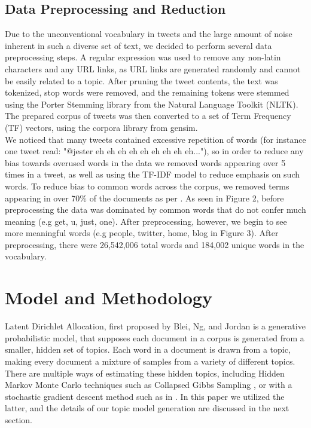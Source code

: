 \documentclass{acm_proc_article-sp}
\begin{document}
\subsection{Data Preprocessing and Reduction}
\hspace*{5mm}Due to the unconventional vocabulary in tweets and the large amount of noise inherent in such a diverse set of text, we decided to perform several data preprocessing steps. A regular expression was used to remove any non-latin characters and any URL links, as URL links are generated randomly and cannot be easily related to a topic. After pruning the tweet contents, the text was tokenized, stop words were removed, and the remaining tokens were stemmed using the Porter Stemming library from the Natural Language Toolkit (NLTK). The prepared corpus of tweets was then converted to a set of Term Frequency (TF) vectors, using the corpora library from gensim. \\
\hspace*{5mm}We noticed that many tweets contained excessive repetition of words (for instance one tweet read: "@jester eh eh eh eh eh eh eh eh eh..."), so in order to reduce any bias towards overused words in the data we removed words appearing over 5 times in a tweet, as well as using the TF-IDF model to reduce emphasis on such words. To reduce bias to common words across the corpus, we removed terms appearing in over 70\% of the documents as per \cite{zhao2011comparing}. As seen in Figure 2, before preprocessing the data was dominated by common words that do not confer much meaning (e.g get, u, just, one). After preprocessing, however, we begin to see more meaningful words (e.g people, twitter, home, blog in Figure 3). After preprocessing, there were 26,542,006 total words and 184,002 unique words in the vocabulary.\\

\section{Model and Methodology}
\hspace*{5mm}Latent Dirichlet Allocation, first proposed by Blei, Ng, and Jordan \cite{blei2003latent} is a generative probabilistic model, that supposes each document in a corpus is generated from a smaller, hidden set of topics. Each word in a document is drawn from a topic, making every document a mixture of samples from a variety of different topics. There are multiple ways of estimating these hidden topics, including Hidden Markov Monte Carlo techniques such as Collapsed Gibbs Sampling \cite{griffiths2002gibbs}, or with a stochastic gradient descent method such as in \cite{hoffman2010online}. In this paper we utilized the latter, and the details of our topic model generation are discussed in the next section.\\
\end{document}
